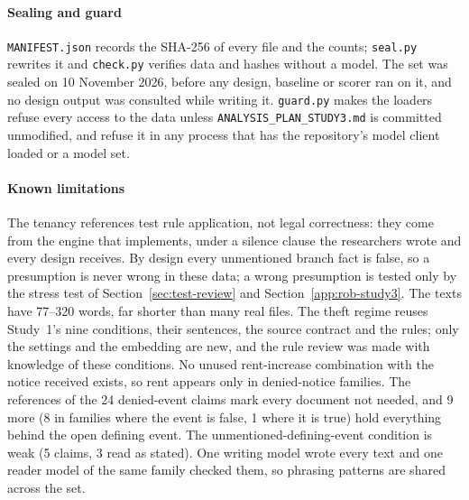 \paragraph{Sealing and guard}
\texttt{MANIFEST.json} records the SHA-256 of every file and the counts; \texttt{seal.py} rewrites it and \texttt{check.py} verifies data and hashes without a model. The set was sealed on 10 November 2026, before any design, baseline or scorer ran on it, and no design output was consulted while writing it. \texttt{guard.py} makes the loaders refuse every access to the data unless \texttt{ANALYSIS\_\allowbreak{}PLAN\_\allowbreak{}STUDY3.md} is committed unmodified, and refuse it in any process that has the repository's model client loaded or a model set.

\paragraph{Known limitations}
The tenancy references test rule application, not legal correctness: they come from the engine that \casepath implements, under a silence clause the researchers wrote and every design receives. By design every unmentioned branch fact is false, so a presumption is never wrong in these data; a wrong presumption is tested only by the stress test of Section~\ref{sec:test-review} and Section~\ref{app:rob-study3}. The texts have 77--320 words, far shorter than many real files. The theft regime reuses Study~1's nine conditions, their sentences, the source contract and the rules; only the settings and the embedding are new, and the rule review was made with knowledge of these conditions. No unused rent-increase combination with the notice received exists, so rent appears only in denied-notice families. The references of the 24 denied-event claims mark every document not needed, and 9 more (8 in families where the event is false, 1 where it is true) hold everything behind the open defining event. The unmentioned-defining-event condition is weak (5 claims, 3 read as stated). One writing model wrote every text and one reader model of the same family checked them, so phrasing patterns are shared across the set.
